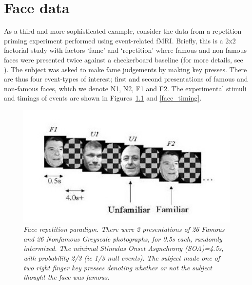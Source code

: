 
\chapter{Face data}

As a third and more sophisticated example, consider the data from a repetition priming experiment performed using event-related fMRI.
 Briefly, this is a 2x2 factorial study with factors `fame' and `repetition' where famous and non-famous faces were presented twice against a checkerboard baseline (for more details, see \cite{rnah_face_rep}). The subject was asked to make fame judgements by making key presses. There are thus four event-types of interest; first and second presentations of famous and non-famous faces, which 
we denote N1, N2, F1 and F2. The experimental stimuli and timings of events are shown in Figures~\ref{face_stim} and \ref{face_timing}.
\begin{figure}
\begin{center}
\includegraphics[width=120mm]{faces/face_stim}
\caption{\em Face repetition paradigm.  There were 2 presentations of 26 Famous and 26 Nonfamous Greyscale photographs, for 0.5s each, randomly intermixed. The 
minimal Stimulus Onset Asynchrony (SOA)=4.5s, with probability 2/3 (ie 1/3 null events). The subject made one of two 
right finger key presses denoting whether or not the subject thought the face was famous. \label{face_stim}}
\end{center}
\end{figure}
